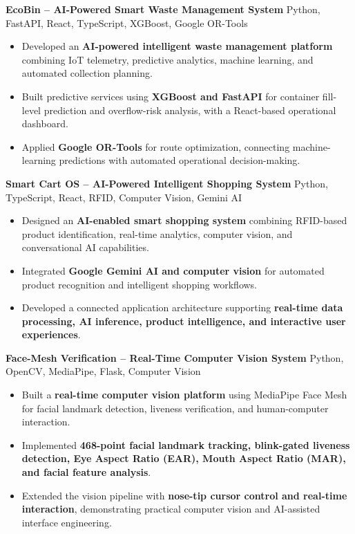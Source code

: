 \documentclass[a4paper,11pt]{article}
\newcommand{\resumeItem}[1]{
    \item \small{#1 \vspace{-2pt}}
}
\newcommand{\resumeProject}[2]{
    \vspace{2pt}
    \textbf{#1} \hfill {\small #2}
    \vspace{2pt}
}
\begin{document}
\resumeProject
{EcoBin -- AI-Powered Smart Waste Management System}
{Python, FastAPI, React, TypeScript, XGBoost, Google OR-Tools}

\begin{itemize}[leftmargin=*]

\resumeItem{Developed an \textbf{AI-powered intelligent waste management platform} combining IoT telemetry, predictive analytics, machine learning, and automated collection planning.}

\resumeItem{Built predictive services using \textbf{XGBoost and FastAPI} for container fill-level prediction and overflow-risk analysis, with a React-based operational dashboard.}

\resumeItem{Applied \textbf{Google OR-Tools} for route optimization, connecting machine-learning predictions with automated operational decision-making.}

\end{itemize}

\vspace{1mm}

\resumeProject
{Smart Cart OS -- AI-Powered Intelligent Shopping System}
{Python, TypeScript, React, RFID, Computer Vision, Gemini AI}

\begin{itemize}[leftmargin=*]

\resumeItem{Designed an \textbf{AI-enabled smart shopping system} combining RFID-based product identification, real-time analytics, computer vision, and conversational AI capabilities.}

\resumeItem{Integrated \textbf{Google Gemini AI and computer vision} for automated product recognition and intelligent shopping workflows.}

\resumeItem{Developed a connected application architecture supporting \textbf{real-time data processing, AI inference, product intelligence, and interactive user experiences}.}

\end{itemize}

\vspace{1mm}

\resumeProject
{Face-Mesh Verification -- Real-Time Computer Vision System}
{Python, OpenCV, MediaPipe, Flask, Computer Vision}

\begin{itemize}[leftmargin=*]

\resumeItem{Built a \textbf{real-time computer vision platform} using MediaPipe Face Mesh for facial landmark detection, liveness verification, and human-computer interaction.}

\resumeItem{Implemented \textbf{468-point facial landmark tracking, blink-gated liveness detection, Eye Aspect Ratio (EAR), Mouth Aspect Ratio (MAR), and facial feature analysis}.}

\resumeItem{Extended the vision pipeline with \textbf{nose-tip cursor control and real-time interaction}, demonstrating practical computer vision and AI-assisted interface engineering.}

\end{itemize}
\end{document}
